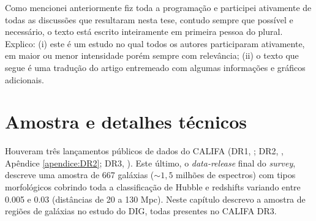 Como mencionei anteriormente fiz toda a programação e participei ativamente de todas as discussões que resultaram nesta tese, contudo sempre que possível e necessário, o texto está escrito inteiramente em primeira pessoa do plural. Explico: (i) este é um estudo no qual todos os autores participaram ativamente, em maior ou menor intensidade porém sempre com relevância; (ii) o texto que segue é uma tradução do artigo \citet[][Apêndice \ref{apendice:DIGpaper0}]{Lacerda.etal.2018} entremeado com algumas informações e gráficos adicionais.





\chapter{Amostra e detalhes técnicos}
\label{sec:sample}

Houveram três lançamentos públicos de dados do CALIFA (DR1, \citealt{Husemann.etal.2013a}; DR2, \citealt{GarciaBenito.etal.2015a}, Apêndice \ref{apendice:DR2}; DR3, \citealt{SFSanchez.DR3.2016}). Este último, o {\em data-release} final do {\em survey}, descreve uma amostra de 667 galáxias ($\sim 1,5$ milhões de espectros) com tipos morfológicos cobrindo toda a classificação de Hubble e redshifts variando entre 0.005 e 0.03 (distâncias de 20 a 130 Mpc). Neste capítulo descrevo a amostra de regiões de galáxias no estudo do DIG, todas presentes no CALIFA DR3.


